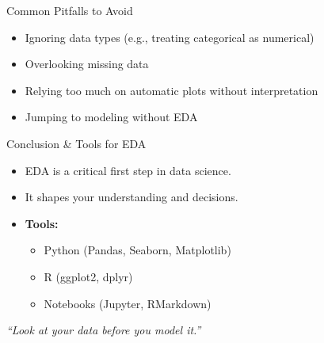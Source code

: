 \documentclass[aspectratio=169]{beamer}
\begin{document}
\begin{frame}{Common Pitfalls to Avoid}
  \begin{itemize}
    \item Ignoring data types (e.g., treating categorical as numerical)
    \item Overlooking missing data
    \item Relying too much on automatic plots without interpretation
    \item Jumping to modeling without EDA
  \end{itemize}
\end{frame}

\begin{frame}{Conclusion \& Tools for EDA}
  \begin{itemize}
    \item EDA is a critical first step in data science.
    \item It shapes your understanding and decisions.
    \item \textbf{Tools:}
    \begin{itemize}
      \item Python (Pandas, Seaborn, Matplotlib)
      \item R (ggplot2, dplyr)
      \item Notebooks (Jupyter, RMarkdown)
    \end{itemize}
  \end{itemize}
  \vspace{0.3cm}
  \textit{“Look at your data before you model it.”}
\end{frame}
\end{document}
